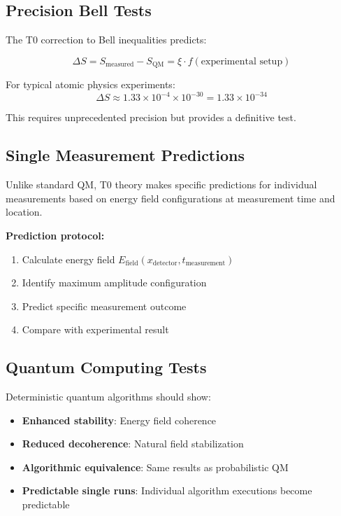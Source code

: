 \documentclass[12pt,a4paper]{report}
\begin{document}
\subsection{Precision Bell Tests}
\label{subsec:precision_bell_tests}

The T0 correction to Bell inequalities predicts:

\begin{equation}
	\Delta S = S_{\text{measured}} - S_{\text{QM}} = \xi \cdot f(\text{experimental setup})
\end{equation}

For typical atomic physics experiments:
\begin{equation}
	\Delta S \approx 1.33 \times 10^{-4} \times 10^{-30} = 1.33 \times 10^{-34}
\end{equation}

This requires unprecedented precision but provides a definitive test.

\subsection{Single Measurement Predictions}
\label{subsec:single_measurement_predictions}

Unlike standard QM, T0 theory makes specific predictions for individual measurements based on energy field configurations at measurement time and location.

\textbf{Prediction protocol:}
\begin{enumerate}
	\item Calculate energy field $E_{\text{field}}(x_{\text{detector}}, t_{\text{measurement}})$
	\item Identify maximum amplitude configuration
	\item Predict specific measurement outcome
	\item Compare with experimental result
\end{enumerate}

\subsection{Quantum Computing Tests}
\label{subsec:quantum_computing_tests}

Deterministic quantum algorithms should show:
\begin{itemize}
	\item \textbf{Enhanced stability}: Energy field coherence
	\item \textbf{Reduced decoherence}: Natural field stabilization
	\item \textbf{Algorithmic equivalence}: Same results as probabilistic QM
	\item \textbf{Predictable single runs}: Individual algorithm executions become predictable
\end{itemize}
\end{document}
